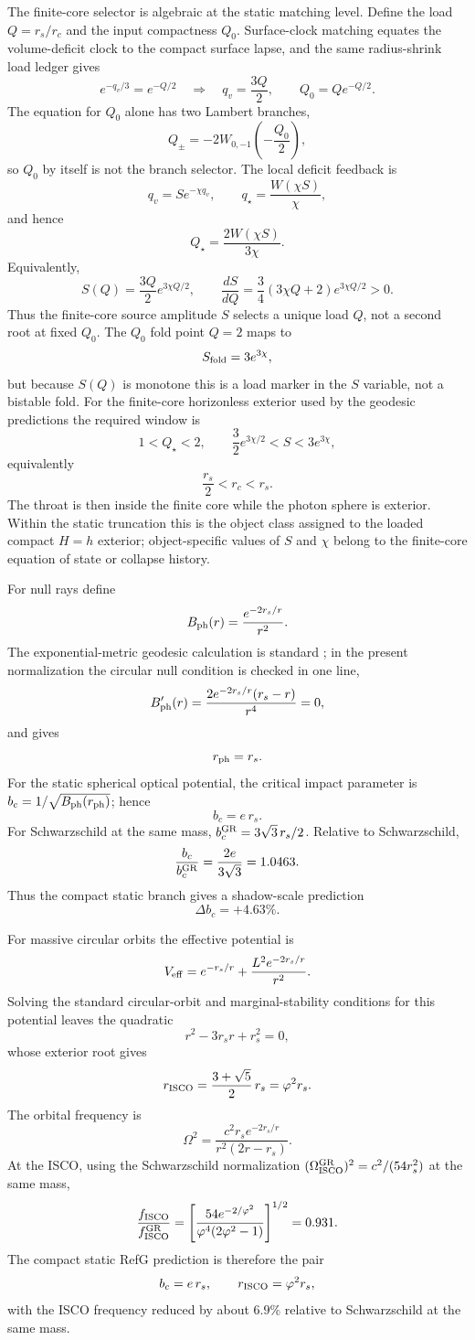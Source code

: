 \documentclass[12pt,a4paper]{article}
\begin{document}
The finite-core selector is algebraic at the static matching level.  Define the
load $Q=r_s/r_c$ and the input compactness $Q_0$.  Surface-clock matching
equates the volume-deficit clock to the compact surface lapse, and the same
radius-shrink load ledger gives
\[
e^{-q_v/3}=e^{-Q/2}\quad\Rightarrow\quad q_v=\frac{3Q}{2},\qquad
Q_0=Qe^{-Q/2}.
\]
The equation for $Q_0$ alone has two Lambert branches,
\[
Q_\pm=-2W_{0,-1}\!\left(-\frac{Q_0}{2}\right),
\]
so $Q_0$ by itself is not the branch selector.  The local deficit feedback is
\[
q_v=Se^{-\chi q_v},\qquad q_\star=\frac{W(\chi S)}{\chi},
\]
and hence
\[
Q_\star=\frac{2W(\chi S)}{3\chi}.
\]
Equivalently,
\[
S(Q)=\frac{3Q}{2}e^{3\chi Q/2},\qquad
\frac{dS}{dQ}=\frac34(3\chi Q+2)e^{3\chi Q/2}>0.
\]
Thus the finite-core source amplitude $S$ selects a unique load $Q$, not a
second root at fixed $Q_0$. The $Q_0$ fold point $Q=2$ maps to
\[
S_{\rm fold}=3e^{3\chi},
\]
but because $S(Q)$ is monotone this is a load marker in the $S$ variable, not a
bistable fold. For the finite-core horizonless exterior used by the geodesic
predictions the required window is
\[
1<Q_\star<2,\qquad
\frac32 e^{3\chi/2}<S<3e^{3\chi},
\]
equivalently
\[
\frac{r_s}{2}<r_c<r_s.
\]
The throat is then inside the finite core while the photon sphere is exterior.
Within the static truncation this is the object class assigned to the loaded
compact $H=h$ exterior; object-specific values of $S$ and $\chi$ belong to the
finite-core equation of state or collapse history.

For null rays define
\[
B_{\rm ph}(r)=\frac{e^{-2r_s/r}}{r^2}.
\]
The exponential-metric geodesic calculation is standard
\cite{Boonserm2018}; in the present normalization the circular null condition
is checked in one line,
\[
B_{\rm ph}'(r)=\frac{2e^{-2r_s/r}(r_s-r)}{r^4}=0,
\]
and gives
\[
r_{\rm ph}=r_s.
\]
For the static spherical optical potential, the critical impact parameter is
$b_c=1/\sqrt{B_{\rm ph}(r_{\rm ph})}$; hence
\[
b_c=e\,r_s.
\]
For Schwarzschild at the same mass, $b_c^{\rm GR}=3\sqrt3\,r_s/2$.
Relative to Schwarzschild,
\[
\frac{b_c}{b_c^{\rm GR}}
=\frac{2e}{3\sqrt3}=1.0463.
\]
Thus the compact static branch gives a shadow-scale prediction
\[
\Delta b_c=+4.63\%.
\]

For massive circular orbits the effective potential is
\[
V_{\rm eff}=e^{-r_s/r}
+\frac{L^2e^{-2r_s/r}}{r^2}.
\]
Solving the standard circular-orbit and marginal-stability conditions for this
potential leaves the quadratic
\[
r^2-3r_s r+r_s^2=0,
\]
whose exterior root gives
\[
r_{\rm ISCO}
=\frac{3+\sqrt5}{2}\,r_s
=\varphi^2r_s.
\]
The orbital frequency is
\[
\Omega^2=
\frac{c^2 r_s e^{-2r_s/r}}{r^2(2r-r_s)}.
\]
At the ISCO, using the Schwarzschild normalization
$(\Omega_{\rm ISCO}^{\rm GR})^2=c^2/(54r_s^2)$ at the same mass,
\[
\frac{f_{\rm ISCO}}{f_{\rm ISCO}^{\rm GR}}
=\left[
\frac{54e^{-2/\varphi^2}}
{\varphi^4(2\varphi^2-1)}
\right]^{1/2}
=0.931.
\]
The compact static RefG prediction is therefore the pair
\[
b_c=e\,r_s,\qquad r_{\rm ISCO}=\varphi^2r_s,
\]
with the ISCO frequency reduced by about $6.9\%$ relative to Schwarzschild at the same mass.
\end{document}
